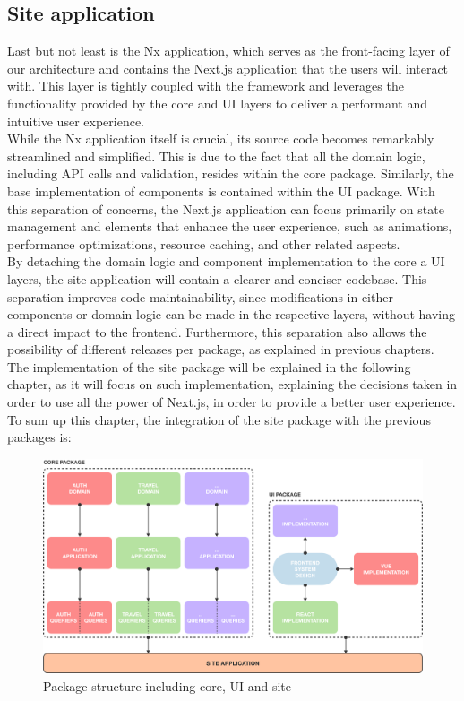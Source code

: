 \documentclass[../design.tex]{subfiles}
\begin{document}
\subsection{Site application}
Last but not least is the Nx application, which serves as the front-facing layer
of our architecture and contains the Next.js application that the users will
interact with. This layer is tightly coupled with the framework and leverages
the functionality provided by the core and UI layers to deliver a performant and
intuitive user experience.
\\[8pt]
While the Nx application itself is crucial, its source code becomes remarkably
streamlined and simplified. This is due to the fact that all the domain logic,
including API calls and validation, resides within the core package. Similarly,
the base implementation of components is contained within the UI package. With
this separation of concerns, the Next.js application can focus primarily on
state management and elements that enhance the user experience, such as
animations, performance optimizations, resource caching, and other related
aspects.
\\
By detaching the domain logic and component implementation to the core a UI
layers, the site application will contain a clearer and conciser codebase. This
separation improves code maintainability, since modifications in either
components or domain logic can be made in the respective layers, without having
a direct impact to the frontend. Furthermore, this separation also allows the
possibility of different releases per package, as explained in previous
chapters.
\\[8pt]
The implementation of the site package will be explained in the following
chapter, as it will focus on such implementation, explaining the decisions taken
in order to use all the power of Next.js, in order to provide a better user
experience. To sum up this chapter, the integration of the site package with the
previous packages is:
\begin{figure}[H]
	\centering
	\includegraphics[width=\textwidth]{./assets/ui-core-site.png}
	\caption{Package structure including core, UI and site}
\end{figure}
\end{document}
